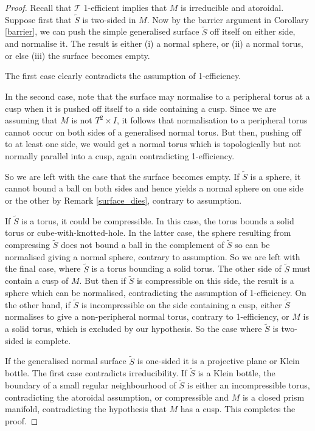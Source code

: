 \documentclass[12pt,reqno]{amsart}  %
\theoremstyle{definition}
\theoremstyle{remark}
\newcommand{\T}{\mathcal{T}}
\begin{document}
\begin{proof} 
Recall that $\T$ 1-efficient implies that $M$ is irreducible and atoroidal. 
Suppose first that $\tilde S$ is two-sided in $M$. Now by the barrier 
argument in Corollary \ref{barrier}, we can push the simple generalised 
surface $\tilde S$ off itself on either side, and normalise it. The result 
is either (i) a normal sphere, or (ii) a normal torus, or else
(iii) the surface becomes empty. 
 
The first case clearly contradicts the assumption of 1-efficiency. 

In the second case, note that the surface may normalise to a peripheral 
torus at a cusp when it is pushed off itself to a side containing a cusp. 
Since we are assuming that $M$ is not $T^2 \times I$, it follows that 
normalisation to a peripheral torus cannot occur on both sides of a 
generalised normal torus. But then, pushing off to at least one side, we 
would get a normal torus which is topologically but not normally parallel 
into a cusp, again contradicting 1-efficiency.  

So we are left with the case that the surface becomes empty. If $\tilde S$ 
is a sphere, it cannot bound a ball on both sides 
and hence yields a normal sphere on one side or the other by 
Remark \ref{surface_dies}, contrary to assumption. 

If $\tilde S$ is a torus, it could be compressible. In this case, the 
torus bounds a solid torus or cube-with-knotted-hole. 
In the latter case, the sphere resulting from compressing $\tilde S$ 
does not bound a ball in the complement of $\tilde S$ 
so can be normalised giving a normal sphere, contrary to assumption. 
So we are left with the final case, where $\tilde S$  is a torus bounding 
a solid torus. The other side of $\tilde S$ must contain a cusp of $M$. 
But then if $\tilde S$ is compressible on this side, 
the result is a sphere which can be normalised, contradicting the 
assumption of 1-efficiency.  On the other hand, if $\tilde S$ is 
incompressible on the side containing a cusp, either $\tilde S$ normalises 
to give a non-peripheral normal torus, contrary to 1-efficiency, 
or $M$ is a solid torus, which is excluded by our hypothesis. So the case 
where $\tilde S$ is two-sided is complete. 

If the generalised normal surface $\tilde S$ is one-sided it is a 
projective plane or Klein bottle. The first case contradicts 
irreducibility. If  $\tilde S$ is a Klein bottle, the boundary of a small 
regular neighbourhood of $\tilde S$ is either an  incompressible torus, 
contradicting the atoroidal assumption, or compressible and $M$ is a 
closed prism manifold, contradicting the hypothesis that $M$ has a cusp. 
This completes the proof. 
\end{proof}
\end{document}
